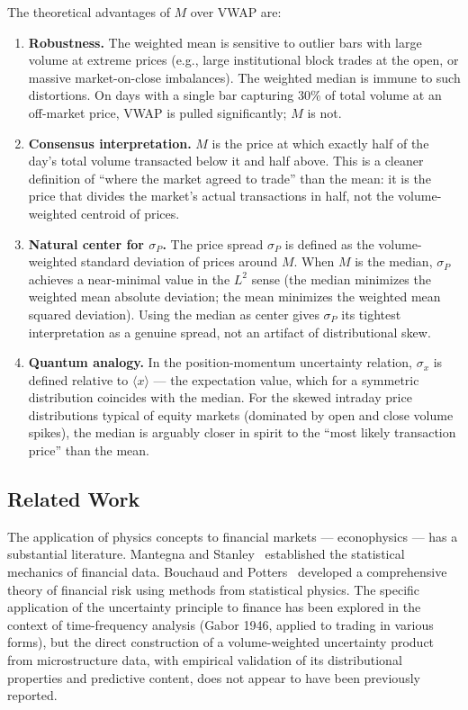 \documentclass[preprint,12pt]{elsarticle}
\begin{document}
The theoretical advantages of $M$ over VWAP are:

\begin{enumerate}
    \item \textbf{Robustness.} The weighted mean is sensitive to outlier bars with large volume at extreme prices (e.g., large institutional block trades at the open, or massive market-on-close imbalances). The weighted median is immune to such distortions. On days with a single bar capturing 30\% of total volume at an off-market price, VWAP is pulled significantly; $M$ is not.

    \item \textbf{Consensus interpretation.} $M$ is the price at which exactly half of the day's total volume transacted below it and half above. This is a cleaner definition of ``where the market agreed to trade'' than the mean: it is the price that divides the market's actual transactions in half, not the volume-weighted centroid of prices.

    \item \textbf{Natural center for $\sigma_P$.} The price spread $\sigma_P$ is defined as the volume-weighted standard deviation of prices around $M$. When $M$ is the median, $\sigma_P$ achieves a near-minimal value in the $L^2$ sense (the median minimizes the weighted mean absolute deviation; the mean minimizes the weighted mean squared deviation). Using the median as center gives $\sigma_P$ its tightest interpretation as a genuine spread, not an artifact of distributional skew.

    \item \textbf{Quantum analogy.} In the position-momentum uncertainty relation, $\sigma_x$ is defined relative to $\langle x \rangle$ --- the expectation value, which for a symmetric distribution coincides with the median. For the skewed intraday price distributions typical of equity markets (dominated by open and close volume spikes), the median is arguably closer in spirit to the ``most likely transaction price'' than the mean.
\end{enumerate}

\subsection{Related Work}

The application of physics concepts to financial markets --- econophysics --- has a substantial literature. Mantegna and Stanley~\cite{mantegna1999introduction} established the statistical mechanics of financial data. Bouchaud and Potters~\cite{bouchaud2003theory} developed a comprehensive theory of financial risk using methods from statistical physics. The specific application of the uncertainty principle to finance has been explored in the context of time-frequency analysis (Gabor 1946, applied to trading in various forms), but the direct construction of a volume-weighted uncertainty product from microstructure data, with empirical validation of its distributional properties and predictive content, does not appear to have been previously reported.
\end{document}
